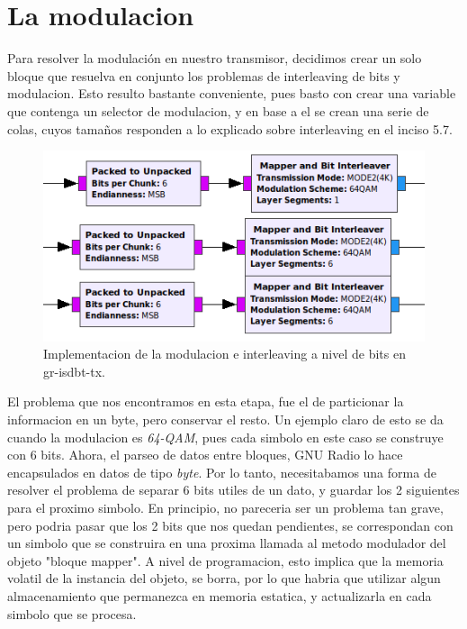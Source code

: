 \section{La modulacion}

Para resolver la modulación en nuestro transmisor, decidimos crear un solo bloque que resuelva en conjunto los problemas de interleaving de bits y modulacion. Esto resulto bastante conveniente, pues basto con crear una variable que contenga un selector de modulacion, y en base a el se crean una serie de colas, cuyos tamaños responden a lo explicado sobre interleaving en el inciso 5.7.

\begin{figure}[h!]
	\centering
	\includegraphics[scale=0.5]{figuras/cap05/modulacion}
	\caption{\label{f:modulacion} Implementacion de la modulacion e interleaving a nivel de bits en gr-isdbt-tx.}
\end{figure}


El problema que nos encontramos en esta etapa, fue el de particionar la informacion en un byte, pero conservar el resto. Un ejemplo claro de esto se da cuando la modulacion es \textit{64-QAM}, pues cada simbolo en este caso se construye con 6 bits. Ahora, el parseo de datos entre bloques, GNU Radio lo hace encapsulados en datos de tipo \textit{byte}. Por lo tanto, necesitabamos una forma de resolver el problema de separar 6 bits utiles de un dato, y guardar los 2 siguientes para el proximo simbolo. En principio, no pareceria ser un problema tan grave, pero podria pasar que los 2 bits que nos quedan pendientes, se correspondan con un simbolo que se construira en una proxima llamada al metodo modulador del objeto "bloque mapper". A nivel de programacion, esto implica que la memoria volatil de la instancia del objeto, se borra, por lo que habria que utilizar algun almacenamiento que permanezca en memoria estatica, y actualizarla en cada simbolo que se procesa.

